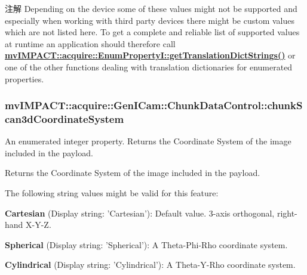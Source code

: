 \begin{DoxyNote}{注解}
Depending on the device some of these values might not be supported and especially when working with third party devices there might be custom values which are not listed here. To get a complete and reliable list of supported values at runtime an application should therefore call {\bfseries \hyperlink{classmv_i_m_p_a_c_t_1_1acquire_1_1_enum_property_i_a0ba6ccbf5ee69784d5d0b537924d26b6}{mv\+I\+M\+P\+A\+C\+T\+::acquire\+::\+Enum\+Property\+I\+::get\+Translation\+Dict\+Strings()}} or one of the other functions dealing with translation dictionaries for enumerated properties. 
\end{DoxyNote}
\hypertarget{classmv_i_m_p_a_c_t_1_1acquire_1_1_gen_i_cam_1_1_chunk_data_control_a2200e547f083391291827a35957d4b8d}{
\subsubsection[{chunk\+Scan3d\+Coordinate\+System}]{ mv\+I\+M\+P\+A\+C\+T\+::acquire\+::\+Gen\+I\+Cam\+::\+Chunk\+Data\+Control\+::chunk\+Scan3d\+Coordinate\+System}}\label{classmv_i_m_p_a_c_t_1_1acquire_1_1_gen_i_cam_1_1_chunk_data_control_a2200e547f083391291827a35957d4b8d}


An enumerated integer property. Returns the Coordinate System of the image included in the payload. 

Returns the Coordinate System of the image included in the payload.

The following string values might be valid for this feature\+:
\begin{DoxyItemize}
\item {\bfseries Cartesian} (Display string\+: 'Cartesian')\+: Default value. 3-\/axis orthogonal, right-\/hand X-\/\+Y-\/\+Z.
\item {\bfseries Spherical} (Display string\+: 'Spherical')\+: A Theta-\/\+Phi-\/\+Rho coordinate system.
\item {\bfseries Cylindrical} (Display string\+: 'Cylindrical')\+: A Theta-\/\+Y-\/\+Rho coordinate system.
\end{DoxyItemize}

